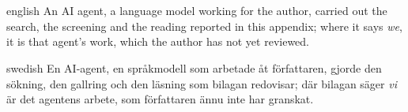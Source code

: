 \section{} %

\begin{onlyin}{english} %
An AI agent, a language model working for the author, carried out the
search, the screening and the reading reported in this appendix; where
it says \emph{we}, it is that agent's work, which the author has not yet
reviewed.
\end{onlyin}
\begin{onlyin}{swedish}
En AI-agent, en språkmodell som arbetade åt författaren, gjorde den
sökning, den gallring och den läsning som bilagan redovisar; där bilagan
säger \emph{vi} är det agentens arbete, som författaren ännu inte har
granskat.
\end{onlyin}

